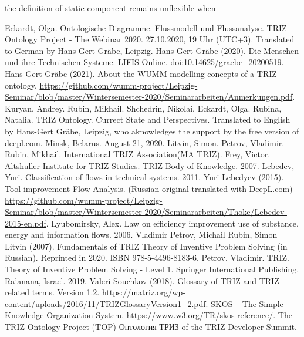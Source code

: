 \documentclass[a4paper,11pt]{article}
\begin{document}
        the definition of static component remains unflexible when 

\begin{thebibliography}{...}
    \raggedright
     Eckardt, Olga. Ontologische Diagramme. Flussmodell und Flussanalyse. TRIZ Ontology Project - The Webinar 2020. 27.10.2020, 19 Uhr (UTC+3). Translated to German by Hans-Gert Gräbe, Leipzig. 
     Hans-Gert Gräbe (2020).  Die Menschen und ihre Technischen Systeme. LIFIS Online.
        \url{doi:10.14625/graebe_20200519}.
     Hans-Gert Gr\"abe (2021). About the WUMM modelling concepts of a TRIZ ontology.
        \url{https://github.com/wumm-project/Leipzig-Seminar/blob/master/Wintersemester-2020/Seminararbeiten/Anmerkungen.pdf}.
     Kuryan, Andrey. Rubin, Mikhail. Shchedrin, Nikolai. Eckardt, Olga. Rubina, Natalia. TRIZ Ontology. Currect State and Perspectives. Translated to English by Hans-Gert Gräbe, Leipzig, who aknowledges the support by the free version of deepl.com. Minsk, Belarus. August 21, 2020.
     Litvin, Simon. Petrov, Vladimir. Rubin, Mikhail. International TRIZ Association(MA TRIZ). Frey, Victor. Altshuller Institute for TRIZ Studies. TRIZ Body of Knowledge. 2007.
     Lebedev, Yuri. Classification of flows in technical systems. 2011.
     Yuri Lebedyev (2015). Tool improvement Flow Analysis. (Russian original translated with DeepL.com)
      \url{https://github.com/wumm-project/Leipzig-Seminar/blob/master/Wintersemester-2020/Seminararbeiten/Thoke/Lebedev-2015-en.pdf}.
     Lyubomirsky, Alex. Law on efficiency improvement use of substance, energy and information flows. 2006.
     Vladimir Petrov, Michail Rubin, Simon Litvin (2007). Fundamentals of TRIZ Theory of Inventive Problem Solving (in Russian). Reprinted in 2020. ISBN 978-5-4496-8183-6.
     Petrov, Vladimir. TRIZ. Theory of Inventive Problem Solving - Level 1. Springer International Publishing. Ra'anana, Israel. 2019.
     Valeri Souchkov (2018).  Glossary of TRIZ and TRIZ-related terms. Version 1.2.
        \url{https://matriz.org/wp-content/uploads/2016/11/TRIZGlossaryVersion1_2.pdf}. 
     SKOS -- The Simple Knowledge Organization System.
        \url{https://www.w3.org/TR/skos-reference/}.
     The TRIZ Ontology Project (TOP) \foreignlanguage{russian}{Онтология ТРИЗ} of the TRIZ Developer Summit.

\end{thebibliography}
\end{document}
